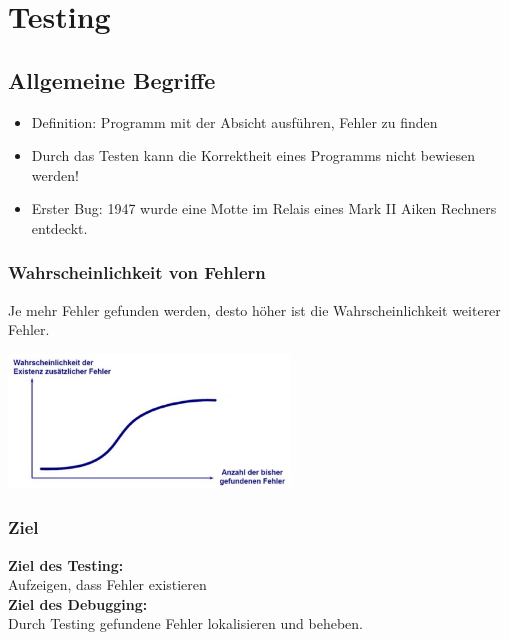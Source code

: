 \section{Testing}
\begin{multicols}{2}

\subsection{Allgemeine Begriffe}
\begin{itemize}
	\item Definition: Programm mit der Absicht ausführen, Fehler zu finden
	\item Durch das Testen kann die Korrektheit eines Programms nicht bewiesen werden!
	\item Erster Bug: 1947 wurde eine Motte im Relais eines Mark II Aiken Rechners entdeckt.
\end{itemize}

\subsubsection{Wahrscheinlichkeit von Fehlern}
Je mehr Fehler gefunden werden, desto höher ist die Wahrscheinlichkeit weiterer Fehler.
\begin{center}
	\includegraphics[width=7.5cm]{images/fehler_wkeit.png}
\end{center}

\subsubsection{Ziel}
\textbf{Ziel des Testing:} \\
Aufzeigen, dass Fehler existieren \\

\textbf{Ziel des Debugging:} \\
Durch Testing gefundene Fehler lokalisieren und beheben. \\


\end{multicols}
